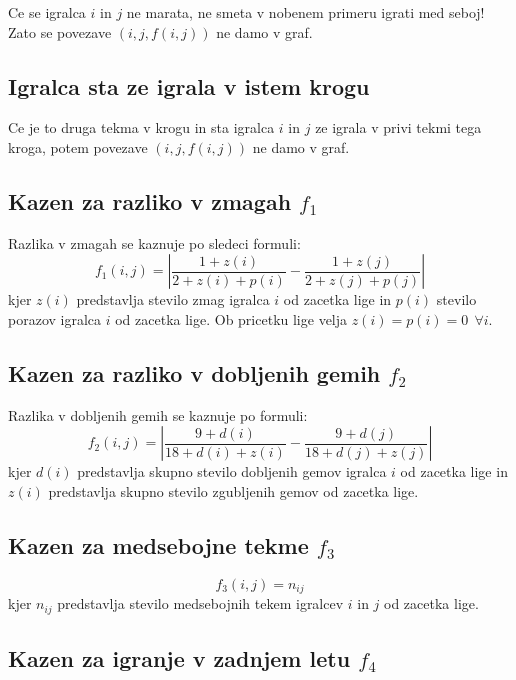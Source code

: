 \documentclass[a4paper, 11pt]{article}
\begin{document}
Ce se igralca $i$ in $j$ ne marata, ne smeta v nobenem primeru igrati med seboj! Zato se povezave $\left(i,j,f(i,j)\right)$ ne damo v graf.

\subsection{Igralca sta ze igrala v istem krogu}

Ce je to druga tekma v krogu in sta igralca $i$ in $j$ ze igrala v privi tekmi tega kroga, potem povezave $\left(i,j,f(i,j)\right)$ ne damo v graf.

\subsection{Kazen za razliko v zmagah $f_1$}

Razlika v zmagah se kaznuje po sledeci formuli:
\begin{equation}
	f_1(i,j) = \left|\frac{1 + z(i)}{2 + z(i) + p(i)} - \frac{1 + z(j)}{2 + z(j) + p(j)}\right|
\end{equation}
kjer $z(i)$ predstavlja stevilo zmag igralca $i$ od zacetka lige in $p(i)$ stevilo porazov igralca $i$ od zacetka lige. Ob pricetku lige velja $z(i) = p(i) = 0 \:\: \forall i$.

\subsection{Kazen za razliko v dobljenih gemih $f_2$}

Razlika v dobljenih gemih se kaznuje po formuli:
\begin{equation}
	f_2(i,j) = \left|\frac{9 + d(i)}{18 + d(i) + z(i)} - \frac{9 + d(j)}{18 + d(j) + z(j)}\right|
\end{equation}
kjer $d(i)$ predstavlja skupno stevilo dobljenih gemov igralca $i$ od zacetka lige in $z(i)$ predstavlja skupno stevilo zgubljenih gemov od zacetka lige.

\subsection{Kazen za medsebojne tekme $f_3$}

\begin{equation}
	f_3(i,j) = n_{ij}
\end{equation}
kjer $n_{ij}$ predstavlja stevilo medsebojnih tekem igralcev $i$ in $j$ od zacetka lige.

\subsection{Kazen za igranje v zadnjem letu $f_4$}
\end{document}
